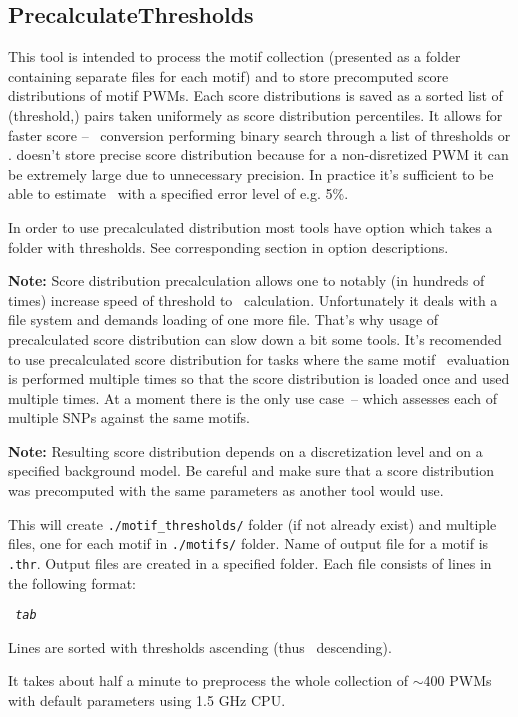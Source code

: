 \subsection{PrecalculateThresholds}
This tool is intended to process the motif collection (presented as a folder containing separate 
files for each motif) and to store precomputed score distributions of motif PWMs. Each score distributions is saved as a sorted list of \mbox{(threshold,\pvalue)} pairs taken uniformely as score distribution percentiles. It allows for faster score -- \pvalue\ conversion performing binary search through a list of thresholds or \pvalues.  doesn't store precise score distribution because for a non-disretized PWM it can be extremely large due to unnecessary precision. In practice it's sufficient to be able to estimate \pvalue\ with a specified error level of e.g. 5\%.

In order to use precalculated distribution most tools have  option which takes a folder with thresholds. See corresponding section in option descriptions.

\textbf{Note:} Score distribution precalculation allows one to notably (in hundreds of times) increase speed of threshold to \pvalue\ calculation. Unfortunately it deals with a file system and demands loading of one more file. That's why usage of precalculated score distribution can slow down a bit some tools. It's recomended to use precalculated score distribution for tasks where the same motif \pvalue\ evaluation is performed multiple times so that the score distribution is loaded once and used multiple times. At a moment there is the only use case~--  which assesses each of multiple SNPs against the same motifs.

\textbf{Note:} Resulting score distribution depends on a discretization level and on a specified background model. Be careful and make sure that a score distribution was precomputed with the same parameters as another tool would use.

\usageheader
{}

\example{}

This will create \texttt{./motif\_thresholds/} folder (if not already exist) and multiple files, one for each motif in \texttt{./motifs/} folder. Name of output file for a motif is \texttt{.thr}. Output files are created in a specified folder.
Each file consists of lines in the following format: 

\texttt{ \textit{tab} }

Lines are sorted with thresholds ascending (thus \pvalue\ descending).

It takes about half a minute to preprocess the whole collection of $\sim$400 PWMs with default 
parameters using 1.5 GHz CPU.
